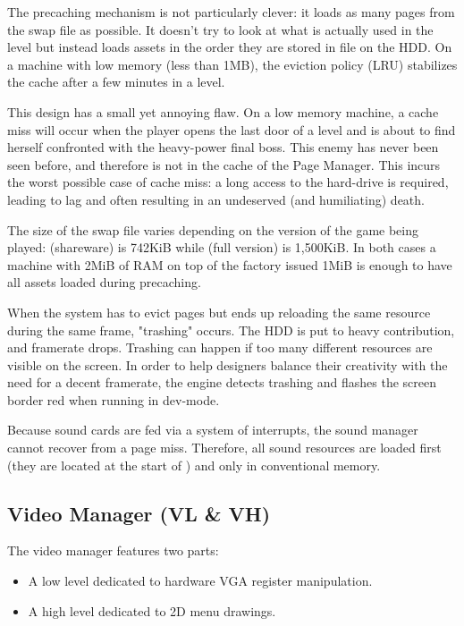 \documentclass[book.tex]{subfiles}
\begin{document}
 \par
The precaching mechanism is not particularly clever: it loads as many pages from the swap file as possible. It doesn't try to look at what is actually used in the level but instead loads assets in the order they are stored in  file on the HDD. On a machine with low memory (less than 1MB), the eviction policy (LRU) stabilizes the cache after a few minutes in a level.\\
\par
This design has a small yet annoying flaw. On a low memory machine, a cache miss will occur when the player opens the last door of a level and is about to find herself confronted with the heavy-power final boss. This enemy has never been seen before, and therefore is not in the cache of the Page Manager. This incurs the worst possible case of cache miss: a long access to the hard-drive is required, leading to lag and often resulting in an undeserved (and humiliating) death.\\
\par
The size of the swap file varies depending on the version of the game being played:  (shareware) is 742KiB while  (full version) is 1,500KiB. In both cases a machine with 2MiB of RAM on top of the factory issued 1MiB is enough to have all assets loaded during precaching.\\
\par
{} When the system has to evict pages but ends up reloading the same resource during the same frame, "trashing" occurs. The HDD is put to heavy contribution, and framerate drops. Trashing can happen if too many different resources are visible on the screen. In order to help designers balance their creativity with the need for a decent framerate, the engine detects trashing and flashes the screen border red when running in dev-mode.\\
\par
{} Because sound cards are fed via a system of interrupts, the sound manager cannot recover from a page miss. Therefore, all sound resources are loaded first (they are located at the start of ) and only in conventional memory.











\subsection{Video Manager (VL \& VH)}
The video manager features two parts:
\begin{itemize}
\item A low level dedicated to hardware VGA register manipulation.
\item A high level dedicated to 2D menu drawings.
\end{itemize}
\par
\end{document}
